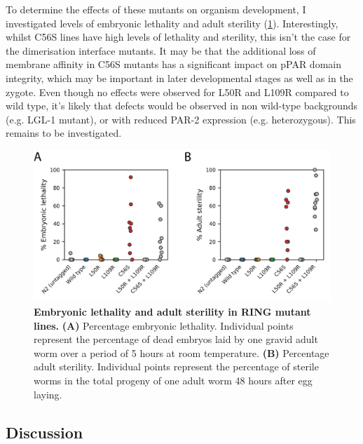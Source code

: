 \documentclass[12pt]{"report"}
\newcommand{\mycaption}[2]{\caption[#1]{\textbf{#1.} #2}}
\begin{document}
To determine the effects of these mutants on organism development, I investigated levels of embryonic lethality and adult sterility (\cref{fig:ring_lines_lethality_sterility}). Interestingly, whilst C56S lines have high levels of lethality and sterility, this isn't the case for the dimerisation interface mutants. It may be that the additional loss of membrane affinity in C56S mutants has a significant impact on pPAR domain integrity, which may be important in later developmental stages as well as in the zygote. Even though no effects were observed for L50R and L109R compared to wild type, it's likely that defects would be observed in non wild-type backgrounds (e.g. LGL-1 mutant), or with reduced PAR-2 expression (e.g. heterozygous). This remains to be investigated.\\

\begin{figure}
\includegraphics[scale=1]{ring_lines_lethality_sterility}
\centering
\mycaption{Embryonic lethality and adult sterility in RING mutant lines}{
\textbf{(A)} Percentage embryonic lethality. Individual points represent the percentage of dead embryos laid by one gravid adult worm over a period of 5 hours at room temperature.
\textbf{(B)} Percentage adult sterility. Individual points represent the percentage of sterile worms in the total progeny of one adult worm 48 hours after egg laying.
}
\label{fig:ring_lines_lethality_sterility}
\end{figure}


\subsection{Discussion}


\end{document}
